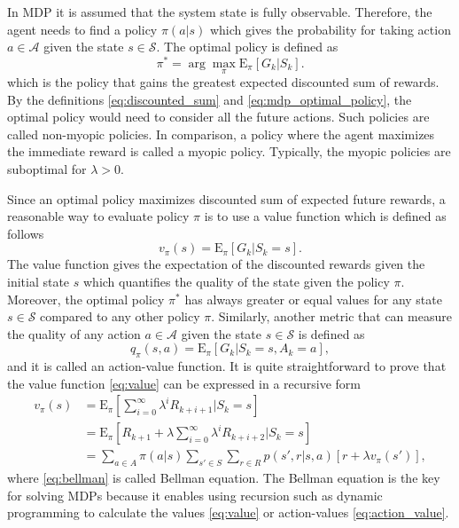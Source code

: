 \documentclass[english, 12pt, a4paper, elec, utf8, a-1b, online]{aaltothesis}
\newcommand{\Epolicy}[1]{\mathrm{E}_\pi \left[ #1 \right]}
\newcommand{\Ss}{\mathcal{S}}
\newcommand{\As}{\mathcal{A}}
\begin{document}
In MDP it is assumed that the system state is fully observable.
Therefore, the agent needs to find a policy $\pi(a | s)$ which gives the probability for taking action $a \in \As$ given the state $s \in \Ss$.
The optimal policy is defined as
\begin{equation}\label{eq:mdp_optimal_policy}
    \pi^* = \arg\max_\pi\Epolicy{G_k | S_k}.
\end{equation}
which is the policy that gains the greatest expected discounted sum of rewards.
By the definitions \eqref{eq:discounted_sum} and \eqref{eq:mdp_optimal_policy}, the optimal policy would need to consider all the future actions.
Such policies are called non-myopic policies.
In comparison, a policy where the agent maximizes the immediate reward is called a myopic policy. 
Typically, the myopic policies are suboptimal for $\lambda>0$.

Since an optimal policy maximizes discounted sum of expected future rewards, a reasonable way to evaluate policy $\pi$ is to use a value function which is defined as follows
\begin{equation} \label{eq:value}
    v_\pi(s) = \Epolicy{G_k | S_k=s}.
\end{equation}
The value function gives the expectation of the discounted rewards given the initial state $s$ which quantifies the quality of the state given the policy $\pi$.
Moreover, the optimal policy $\pi^*$ has always greater or equal values for any state $s \in \Ss$ compared to any other policy $\pi$.
Similarly, another metric that can measure the quality of any action $a \in \As$ given the state $s \in \Ss$ is defined as
\begin{equation}\label{eq:action_value}
    q_\pi(s, a) = \Epolicy{G_k | S_k=s, A_k=a},
\end{equation}
and it is called an action-value function.
It is quite straightforward to prove that the value function \eqref{eq:value} can be expressed in a recursive form 
\begin{align}
    v_\pi(s) 
    &= \Epolicy{ \sum_{i=0}^{\infty} \lambda^i R_{k + i + 1} | S_k=s} \\
    &= \Epolicy{R_{k + 1} + \lambda \sum_{i=0}^{\infty} \lambda^i R_{k + i + 2} | S_k=s} \\
    &= \sum_{a \in A} \pi(a | s) \sum_{s' \in S} \sum_{r \in R} p(s', r | s, a) \left[ r + \lambda v_\pi(s') \right]\label{eq:bellman},
\end{align}
where \eqref{eq:bellman} is called Bellman equation.
The Bellman equation is the key for solving MDPs because it enables using recursion such as dynamic programming to calculate the values \eqref{eq:value} or action-values \eqref{eq:action_value}.
\end{document}
